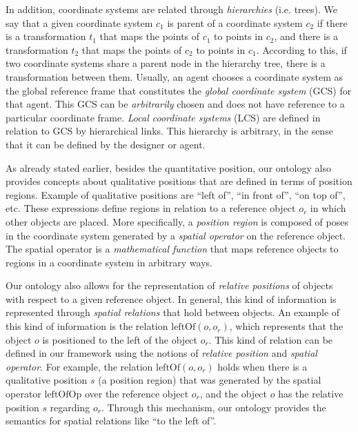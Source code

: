 \documentclass[preprint,12pt]{elsarticle}
\newcommand{\qm}[1]{``#1''}
\begin{document}
In addition, coordinate systems are related through \emph{hierarchies} (i.e. trees). We say that a given coordinate system $c_\mathit{1}$ is parent of a coordinate system $c_\mathit{2}$ if there is a transformation $t_\mathit{1}$ that maps the points of $c_\mathit{1}$ to points in $c_\mathit{2}$, and there is a transformation $t_\mathit{2}$ that maps the points of $c_\mathit{2}$ to points in $c_\mathit{1}$. According to this, if two coordinate systems share a parent node in the hierarchy tree, there is a transformation between them. Usually, an agent chooses a coordinate system as the global reference frame that constitutes the \emph{global coordinate system} (GCS) for that agent. This GCS can be \emph{arbitrarily} chosen and does not have reference to a particular coordinate frame. \emph{Local coordinate systems} (LCS) are defined in relation to GCS by hierarchical links. This hierarchy is arbitrary, in the sense that it can be defined by the designer or agent.

As already stated earlier, besides the quantitative position, our ontology also provides concepts about qualitative positions that are defined in terms of position regions. Example of qualitative positions are ``left of'', ``in front of'', ``on top of'', etc. These expressions define regions in relation to a reference object $o_r$ in which other objects are placed. More specifically, a \emph{position region} is composed of poses in the coordinate system generated by a \emph{spatial operator} on the reference object. The spatial operator is a \emph{mathematical function} that maps reference objects to regions in a coordinate system in arbitrary ways.

Our ontology also allows for the representation of \emph{relative positions} of objects with respect to a given reference object. In general, this kind of information is represented through \emph{spatial relations} that hold between objects. An example of this kind of information is the relation $\mathrm{leftOf}(o, o_\mathit{r})$, which represents that the object $o$ is positioned to the left of the object $o_\mathit{r}$. This kind of relation can be defined in our framework using the notions of \emph{relative position} and \emph{spatial operator}. For example, the relation $\mathrm{leftOf}(o, o_\mathit{r})$ holds when there is a qualitative position $s$ (a position region) that was generated by the spatial operator $\mathrm{leftOfOp}$ over the reference object $o_\mathit{r}$, and the object $o$ has the relative position $s$ regarding $o_\mathit{r}$. Through this mechanism, our ontology provides the semantics for spatial relations like \qm{to the left of}.
\end{document}
